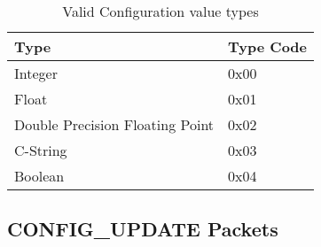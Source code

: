 \documentclass[11pt]{article}
\begin{document}
\begin{table}[h!]
    \centering
    \caption{Valid Configuration value types}
    \label{tab:configTypes}
    \begin{tabular}{|p{3in}|p{.5in}|}
        \hline
        Type & Type Code\\
        \hline
        Integer & 0x00\\
        \hline
        Float & 0x01\\
        \hline
        Double Precision Floating Point & 0x02\\
        \hline
        C-String & 0x03\\
        \hline
        Boolean & 0x04 \\
        \hline
    \end{tabular}
\end{table}

\subsection {CONFIG\_UPDATE Packets}
\end{document}
